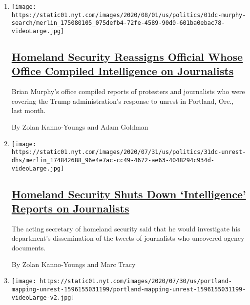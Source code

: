 \begin{enumerate}
\def\labelenumi{\arabic{enumi}.}
\item
  \texttt{[image: https://static01.nyt.com/images/2020/08/01/us/politics/01dc-murphy-search/merlin\_175080105\_075defb4-72fe-4589-90d0-601ba0ebac78-videoLarge.jpg]}

  \hypertarget{homeland-security-reassigns-official-whose-office-compiled-intelligence-on-journalists}{%
  \subsection{\texorpdfstring{\href{/2020/08/01/us/politics/brian-murphy-homeland-security-protesters.html}{Homeland
  Security Reassigns Official Whose Office Compiled Intelligence on
  Journalists}}{Homeland Security Reassigns Official Whose Office Compiled Intelligence on Journalists}}\label{homeland-security-reassigns-official-whose-office-compiled-intelligence-on-journalists}}

  Brian Murphy's office compiled reports of protesters and journalists
  who were covering the Trump administration's response to unrest in
  Portland, Ore., last month.

  By Zolan Kanno-Youngs and Adam Goldman
\item
  \texttt{[image: https://static01.nyt.com/images/2020/07/31/us/politics/31dc-unrest-dhs/merlin\_174842688\_96e4e7ac-cc49-4672-ae63-4048294c934d-videoLarge.jpg]}

  \hypertarget{homeland-security-shuts-down-intelligence-reports-on-journalists}{%
  \subsection{\texorpdfstring{\href{/2020/07/31/us/politics/homeland-security-portland.html}{Homeland
  Security Shuts Down `Intelligence' Reports on
  Journalists}}{Homeland Security Shuts Down `Intelligence' Reports on Journalists}}\label{homeland-security-shuts-down-intelligence-reports-on-journalists}}

  The acting secretary of homeland security said that he would
  investigate his department's dissemination of the tweets of
  journalists who uncovered agency documents.

  By Zolan Kanno-Youngs and Marc Tracy
\item
  \texttt{[image: https://static01.nyt.com/images/2020/07/30/us/portland-mapping-unrest-1596155031199/portland-mapping-unrest-1596155031199-videoLarge-v2.jpg]}


\end{enumerate}
